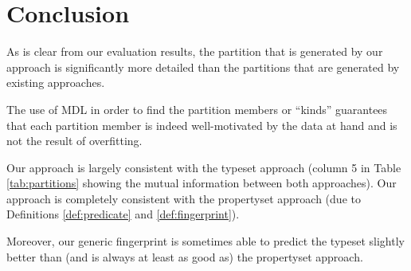 \section{Conclusion}
\label{sec:conclusion}

As is clear from our evaluation results,
 the partition that is generated by our approach
 is significantly more detailed than
 the partitions that are generated by existing approaches.

The use of MDL in order to find the partition members or ``kinds''
 guarantees that each partition member is indeed well-motivated
 by the data at hand and is not the result of overfitting.

Our approach is largely consistent with the typeset approach
 (column 5 in Table \ref{tab:partitions} showing the mutual information
  between both approaches).
Our approach is completely consistent with the propertyset approach
 (due to Definitions \ref{def:predicate} and \ref{def:fingerprint}).

Moreover, our generic fingerprint is sometimes able to predict
 the typeset slightly better than (and is always at least as good as)
 the propertyset approach.

